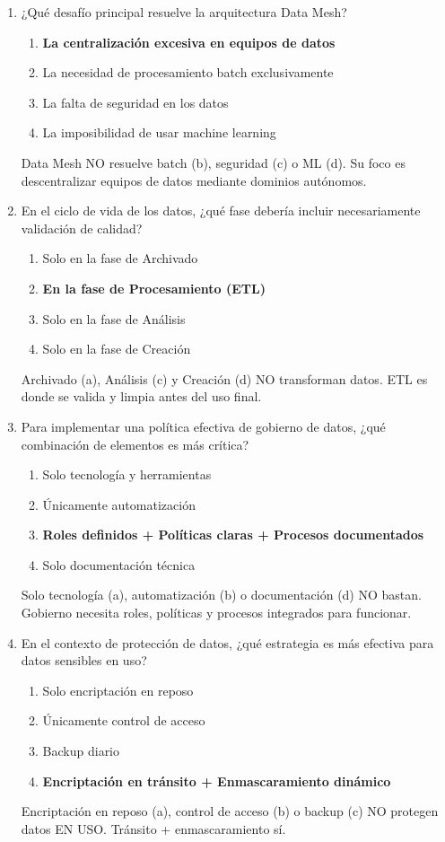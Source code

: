 \documentclass[12pt]{article}
\begin{document}
\begin{enumerate}[label=\arabic*.]
\item ¿Qué desafío principal resuelve la arquitectura Data Mesh?
\begin{enumerate}
    \item \textbf{La centralización excesiva en equipos de datos}
    \item La necesidad de procesamiento batch exclusivamente
    \item La falta de seguridad en los datos
    \item La imposibilidad de usar machine learning
\end{enumerate}
Data Mesh NO resuelve batch (b), seguridad (c) o ML (d). Su foco es descentralizar equipos de datos mediante dominios autónomos.

\item En el ciclo de vida de los datos, ¿qué fase debería incluir necesariamente validación de calidad?
\begin{enumerate}
    \item Solo en la fase de Archivado
    \item \textbf{En la fase de Procesamiento (ETL)}
    \item Solo en la fase de Análisis
    \item Solo en la fase de Creación
\end{enumerate}
Archivado (a), Análisis (c) y Creación (d) NO transforman datos. ETL es donde se valida y limpia antes del uso final.

\item Para implementar una política efectiva de gobierno de datos, ¿qué combinación de elementos es más crítica?
\begin{enumerate}
    \item Solo tecnología y herramientas
    \item Únicamente automatización
    \item \textbf{Roles definidos + Políticas claras + Procesos documentados}
    \item Solo documentación técnica
\end{enumerate}
Solo tecnología (a), automatización (b) o documentación (d) NO bastan. Gobierno necesita roles, políticas y procesos integrados para funcionar.

\item En el contexto de protección de datos, ¿qué estrategia es más efectiva para datos sensibles en uso?
\begin{enumerate}
    \item Solo encriptación en reposo
    \item Únicamente control de acceso
    \item Backup diario
    \item \textbf{Encriptación en tránsito + Enmascaramiento dinámico}
\end{enumerate}
Encriptación en reposo (a), control de acceso (b) o backup (c) NO protegen datos EN USO. Tránsito + enmascaramiento sí.


\end{enumerate}
\end{document}
